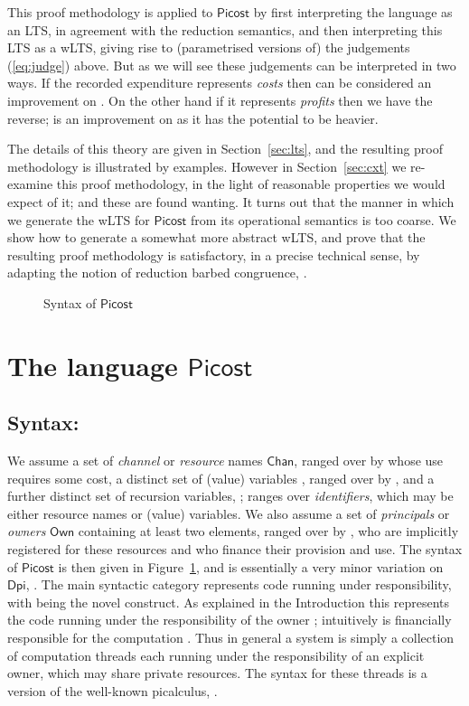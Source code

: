 \documentclass{LMCS}
\newcommand{\pfn}[1]{\mathsf{#1}}  \newcommand{\cfn}[1]{\mathsf{#1}}  \newcommand{\ownfnt}[1]{{\mathsf{#1}}}
\newcommand{\DPI}{\ensuremath{\pfn{Dpi}}\xspace}
\newcommand{\picost}{\ensuremath{\pfn{Picost}}\xspace}
\newcommand{\Own}{\ensuremath{\pfn{Own}}\xspace}
\newcommand{\Chan}{\ensuremath{\pfn{Chan}}\xspace}
\begin{document}
This proof methodology is applied to \picost by first interpreting the
language as an LTS, in agreement with the reduction semantics, and
then interpreting this LTS as a wLTS, giving rise to (parametrised 
versions of) the judgements
(\ref{eq:judge}) above.  But as we will see these judgements can be
interpreted in two ways. If the recorded expenditure represents
\emph{costs} then  can be considered an improvement
on . On the other hand if it represents
\emph{profits} then we have the reverse;  is an
improvement on  as it has the potential to be
heavier.

The details of this theory are given in Section~\ref{sec:lts}, and the
resulting proof methodology is illustrated by examples.  However in
Section~\ref{sec:cxt} we re-examine this proof methodology, in the
light of reasonable properties we would expect of it; and these are
found wanting.  It turns out that the manner in which we generate the
wLTS for \picost from its operational semantics is too coarse. We
show how to generate a somewhat more abstract wLTS, and prove that the
resulting proof methodology is satisfactory, in a precise technical
sense,  by adapting the notion of reduction barbed congruence,
\cite{ht92,pibook,pityping,dpibook}.

\begin{figure}[t]


\caption{Syntax of \picost\label{fig:syn}}
\end{figure}



\section{The language \picost}\label{sec:lang}

\subsection{Syntax:}


We assume a set of \emph{channel} or \emph{resource} names \Chan,
ranged over by   whose use requires some cost,
a distinct set of (value) variables , ranged over by
, and a further distinct set of recursion variables,
;  ranges over \emph{identifiers}, which may be either
resource names or (value) variables.  We also assume a set of
\emph{principals} or \emph{owners} \Own containing at least two
elements, ranged over by , who are
implicitly registered for these resources and who finance their
provision and use. The syntax of \picost is then given in
Figure~\ref{fig:syn}, and is essentially a very minor variation on
\DPI, \cite{dpibook}. The main syntactic category represents code
running under responsibility, with  being the novel
construct. As explained in the Introduction this represents the code
 running under the responsibility of the owner ;
intuitively  is financially responsible for the computation
. Thus in general a system is simply a collection of computation
threads each running under the responsibility of an explicit owner,
which may share private resources. The syntax for these threads is a
version of the well-known picalculus, \cite{pibook}.
\end{document}
